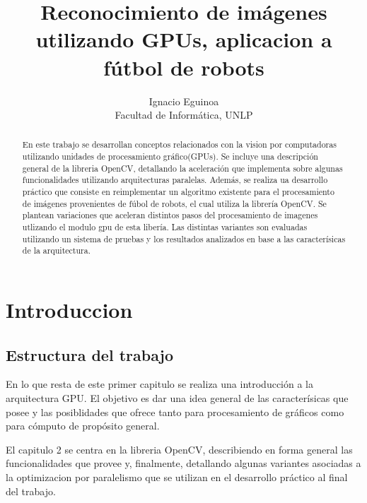 \documentclass[a4paper,10pt]{report}
\title{Reconocimiento de imágenes utilizando GPUs, aplicacion a fútbol de robots}
\author{Ignacio Eguinoa \\
\small Facultad de Informática, UNLP}
\begin{document}
\maketitle


\begin{abstract}

En este trabajo se desarrollan conceptos relacionados con la vision por computadoras utilizando unidades de procesamiento gráfico(GPUs).
Se incluye una descripción general de la libreria OpenCV, detallando la aceleración que implementa sobre algunas funcionalidades utilizando arquitecturas paralelas. 
Además, se realiza ua desarrollo práctico que consiste en reimplementar un algoritmo existente para el procesamiento de imágenes provenientes de fúbol de robots, el cual utiliza la librería OpenCV. 
Se plantean variaciones que aceleran distintos pasos del procesamiento de imagenes utlizando el modulo gpu de esta libería. 
Las distintas variantes son evaluadas utilizando un sistema de pruebas y los resultados analizados en base a las caracterísicas de la arquitectura.



\end{abstract}


\tableofcontents























\chapter{Introduccion}

\section{Estructura del trabajo}
En lo que resta de este primer capitulo se realiza una introducción a la arquitectura GPU. 
El objetivo es dar una idea general de las caracterísicas que posee y las posiblidades que ofrece tanto para procesamiento de gráficos como para cómputo de propósito general.

El capitulo 2 se centra en la libreria OpenCV, describiendo en forma general las funcionalidades que provee y, finalmente, detallando algunas variantes asociadas a la optimizacion por paralelismo que se utilizan en el desarrollo práctico al final del trabajo. 
\end{document}
